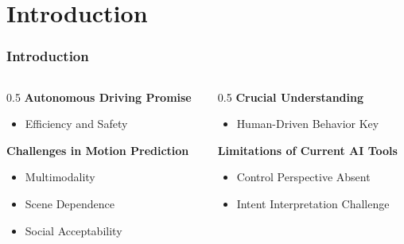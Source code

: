 \section{Introduction}

\begin{frame}
  \frametitle{Introduction}

   \begin{columns}[c]
       \begin{column}{0.5\hsize}
            \textbf{Autonomous Driving Promise}
            \begin{itemize}[]
                \item Efficiency and Safety
            \end{itemize}

            \hfil

            \textbf{Challenges in Motion Prediction}
            
            \begin{itemize}[]
                \item Multimodality
                \item Scene Dependence
                \item Social Acceptability
            \end{itemize}

       \end{column}
       \begin{column}{0.5\hsize}
            \textbf{Crucial Understanding}
            \begin{itemize}[]
                \item Human-Driven Behavior Key
            \end{itemize}

            \hfil

            \textbf{Limitations of Current AI Tools}
            \begin{itemize}[]
                \item Control Perspective Absent
                \item Intent Interpretation Challenge
            \end{itemize}
       \end{column}
   \end{columns}




\end{frame}



